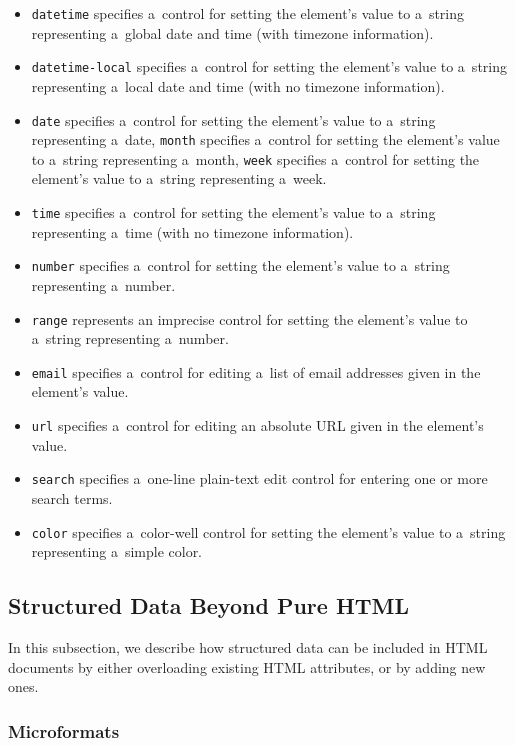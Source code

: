 \begin{itemize}
  \item \texttt{datetime} specifies a~control for setting the
        element’s value to a~string representing a~global date
        and time (with timezone information).
  \item \texttt{datetime-local} specifies a~control for setting
        the element’s value to a~string representing a~local date
        and time (with no timezone information).
  \item \texttt{date} specifies a~control for setting the 
        element’s value to a~string representing a~date,
        \texttt{month} specifies a~control for setting the
        element’s value to a~string representing a~month,
        \texttt{week} specifies a~control for setting the
        element’s value to a~string representing a~week.
  \item \texttt{time} specifies a~control for setting the
        element’s value to a~string representing a~time
        (with no timezone information).
  \item \texttt{number} specifies a~control for setting the
        element’s value to a~string representing a~number.
  \item \texttt{range} represents an imprecise control
        for setting the element’s value to a~string
        representing a~number.
  \item \texttt{email} specifies a~control for editing
        a~list of email addresses given in the element’s value.
  \item \texttt{url} specifies a~control for editing an
        absolute URL given in the element’s value.
  \item \texttt{search} specifies a~one-line plain-text
        edit control for entering one or more search terms.
  \item \texttt{color} specifies a~color-well control for
        setting the element’s value to a~string representing
        a~simple color.
\end{itemize}

\subsection{Structured Data Beyond Pure HTML}

In this subsection, we describe how structured data
can be included in HTML documents
by either overloading existing HTML attributes,
or by adding new ones.

\subsubsection{Microformats}

